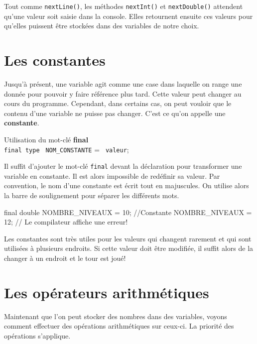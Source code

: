 \documentclass[12pt]{report}
\begin{document}
Tout comme \texttt{nextLine()}, les méthodes \texttt{nextInt()} et \texttt{nextDouble()} attendent qu'une valeur soit saisie dans la console. Elles retournent ensuite ces valeurs pour qu'elles puissent être stockées dans des variables de notre choix.


\section{Les constantes}

Jusqu'à présent, une variable agit comme une case dans laquelle on range une donnée pour pouvoir y faire référence plus tard. Cette valeur peut changer au cours du programme. Cependant, dans certains cas, on peut vouloir que le contenu d'une variable ne puisse pas changer. C'est ce qu'on appelle une \textbf{constante}.

%
\begin{tcolorbox}[enhanced,colframe=ultRed,
	title={Déclaration de constantes},
	sharp corners=south,
	boxsep = 1.5mm]
Utilisation du mot-clé \textbf{final}\\
\texttt{final {\color{ultRed}type}} \texttt{\color[RGB]{255, 34, 12} NOM{\_}CONSTANTE} = \texttt{\color[RGB]{63, 136, 197} valeur};%
\end{tcolorbox}

Il suffit d'ajouter le mot-clé \texttt{final} devant la déclaration pour transformer une variable en constante. Il est alors impossible de redéfinir sa valeur. Par convention, le nom d'une constante est écrit tout en majuscules. On utilise alors la barre de soulignement pour séparer les différents mots.

\begin{code}
	final double NOMBRE_NIVEAUX = 10; //Constante
NOMBRE_NIVEAUX = 12; // Le compilateur affiche une erreur!
\end{code}

Les constantes sont très utiles pour les valeurs qui changent rarement et qui sont utilisées à plusieurs endroits. Si cette valeur doit être modifiée, il suffit alors de la changer à un endroit et le tour est joué!



\section{Les opérateurs arithmétiques}

Maintenant que l'on peut stocker des nombres dans des variables, voyons comment effectuer des opérations arithmétiques sur ceux-ci. La priorité des opérations s'applique.
\end{document}
